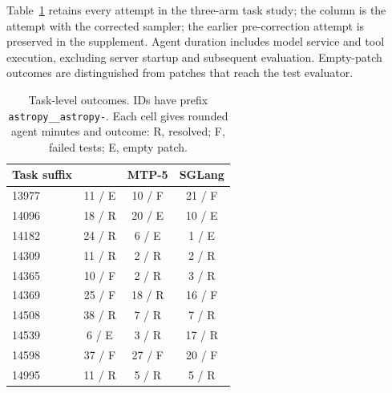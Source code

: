 Table~\ref{tab:swe-tasks} retains every attempt in the three-arm task study; the \sys{} column is the attempt with the corrected sampler; the earlier pre-correction attempt is preserved in the supplement. Agent duration includes model service and tool execution, excluding server startup and subsequent evaluation. Empty-patch outcomes are distinguished from patches that reach the test evaluator.

\begin{table}[!htbp]
\caption{Task-level outcomes. IDs have prefix \texttt{astropy\_\_astropy-}. Each cell gives rounded agent minutes and outcome: R, resolved; F, failed tests; E, empty patch.}
\label{tab:swe-tasks}
\centering\small
\begin{tabular}{@{}lccc@{}}
\toprule
Task suffix & \sys{} & MTP-5 & SGLang \\
\midrule
13977 & 11 / E & 10 / F & 21 / F \\
14096 & 18 / R & 20 / E & 10 / E \\
14182 & 24 / R & 6 / E & 1 / E \\
14309 & 11 / R & 2 / R & 2 / R \\
14365 & 10 / F & 2 / R & 3 / R \\
14369 & 25 / F & 18 / R & 16 / F \\
14508 & 38 / R & 7 / R & 7 / R \\
14539 & 6 / E & 3 / R & 17 / R \\
14598 & 37 / F & 27 / F & 20 / F \\
14995 & 11 / R & 5 / R & 5 / R \\
\bottomrule
\end{tabular}
\end{table}
